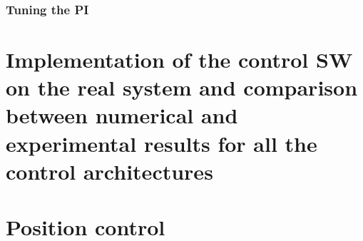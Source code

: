 \documentclass[12pt]{article}
\begin{document}
\subsubsection*{Tuning the PI}

\section{Implementation of the control SW on the real system and comparison between numerical and experimental results for all the control architectures}




\section{Position control}
\end{document}
